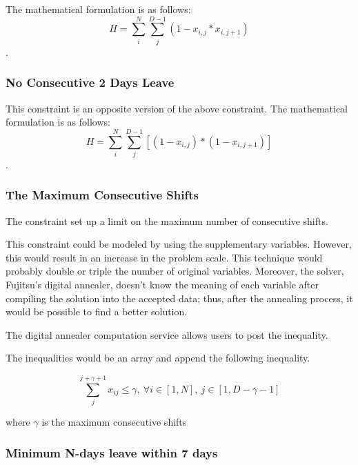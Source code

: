 \documentclass[11pt, oneside]{article}   	%
\begin{document}
The mathematical formulation is as follows:
$$H = \sum_{i}^N\sum_{j}^{D-1}\left(1-x_{i,j} * x_{i,j+1}\right)$$.

\subsubsection{No Consecutive 2 Days Leave}

This constraint is an opposite version of the above constraint. The mathematical formulation is as follows:
$$H = \sum_{i}^N\sum_{j}^{D-1}\left[(1-x_{i,j}) * (1 - x_{i,j+1})\right]$$.

\subsubsection{The Maximum Consecutive Shifts}

The constraint set up a limit on the maximum number of consecutive shifts. 

This constraint could be modeled by using the supplementary variables. However, this would result in an increase in the problem scale. This technique would probably double or triple the number of original variables. Moreover, the solver, Fujitsu's digital annealer, doesn't know the meaning of each variable after compiling the solution into the accepted data; thus, after the annealing process, it would be possible to find a better solution.

The digital annealer computation service allows users to post the inequality.

The inequalities would be an array and append the following inequality.

$$\sum_{j}^{j+\gamma + 1}x_{ij} \leq \gamma, \   \forall i\in[1, N],\  j\in [1, D-\gamma - 1]$$

where $\gamma$ is the maximum consecutive shifts

\subsubsection{Minimum N-days leave within 7 days}
\end{document}
